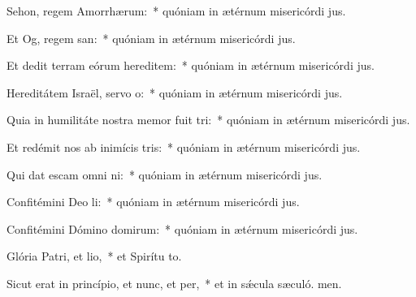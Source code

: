\item Sehon, regem Amorrhærum:~* quóniam in ætérnum misericórdi jus.
\item Et Og, regem san:~* quóniam in ætérnum misericórdi jus.
\item Et dedit terram eórum hereditem:~* quóniam in ætérnum misericórdi jus.
\item Hereditátem Israël, servo o:~* quóniam in ætérnum misericórdi jus.
\item Quia in humilitáte nostra memor fuit tri:~* quóniam in ætérnum misericórdi jus.
\item Et redémit nos ab inimícis tris:~* quóniam in ætérnum misericórdi jus.
\item Qui dat escam omni ni:~* quóniam in ætérnum misericórdi jus.
\item Confitémini Deo li:~* quóniam in ætérnum misericórdi jus.
\item Confitémini Dómino domirum:~* quóniam in ætérnum misericórdi jus.
\item Glória Patri, et lio,~* et Spirítu to.
\item Sicut erat in princípio, et nunc, et per,~* et in sǽcula sæculó. men.
